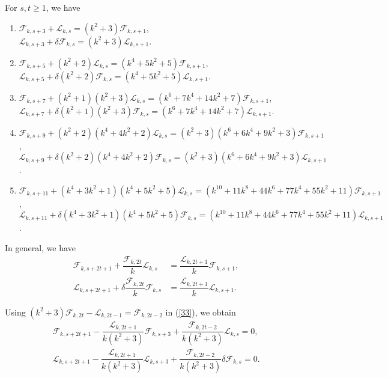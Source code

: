\begin{theorem}For $s, t\geq 1$, we have\label{3.16}
\begin{enumerate}
\item $\mathcal{F}_{k,s+3}+\mathcal{L}_{k,s}=(k^2+3)\mathcal{F}_{k,s+1}$,\\
$\mathcal{L}_{k,s+3}+\delta\mathcal{F}_{k,s}=(k^2+3)\mathcal{L}_{k,s+1}$.
\item $\mathcal{F}_{k,s+5}+(k^2+2)\mathcal{L}_{k,s}=(k^4+5k^2+5)\mathcal{F}_{k,s+1}$,\\
$\mathcal{L}_{k,s+5}+\delta(k^2+2)\mathcal{F}_{k,s}=(k^4+5k^2+5)\mathcal{L}_{k,s+1}$.
\item $\mathcal{F}_{k,s+7}+(k^2+1)(k^2+3)\mathcal{L}_{k,s}=(k^6+7k^4+14k^2+7)\mathcal{F}_{k,s+1}$,\\
$\mathcal{L}_{k,s+7}+\delta(k^2+1)(k^2+3)\mathcal{F}_{k,s}=(k^6+7k^4+14k^2+7)\mathcal{L}_{k,s+1}$.
\item $\mathcal{F}_{k,s+9}+(k^2+2)(k^4+4k^2+2)\mathcal{L}_{k,s}=(k^2+3)(k^6+6k^4+9k^2+3)\mathcal{F}_{k,s+1}$,\\
$\mathcal{L}_{k,s+9}+\delta(k^2+2)(k^4+4k^2+2)\mathcal{F}_{k,s}=(k^2+3)(k^6+6k^4+9k^2+3)\mathcal{L}_{k,s+1}$.
\item $\mathcal{F}_{k,s+11}+(k^4+3k^2+1)(k^4+5k^2+5)\mathcal{L}_{k,s}=(k^{10}+11k^8+44k^6+77k^4+55k^2+11)\mathcal{F}_{k,s+1}$,\\
$\mathcal{L}_{k,s+11}+\delta(k^4+3k^2+1)(k^4+5k^2+5)\mathcal{F}_{k,s}=(k^{10}+11k^8+44k^6+77k^4+55k^2+11)\mathcal{L}_{k,s+1}$.
\end{enumerate}
In general, we have
\begin{align}\label{33}
\mathcal{F}_{k,s+2t+1}+\dfrac{\mathcal{F}_{k,2t}}{k}\mathcal{L}_{k,s}&=\dfrac{\mathcal{L}_{k,2t+1}}{k}\mathcal{F}_{k,s+1},\\
\mathcal{L}_{k,s+2t+1}+\delta\dfrac{\mathcal{F}_{k,2t}}{k}\mathcal{F}_{k,s}&=\dfrac{\mathcal{L}_{k,2t+1}}{k}\mathcal{L}_{k,s+1}.
\end{align}
\end{theorem}
\begin{remark}
Using $(k^2+3)\mathcal{F}_{k,2t}-\mathcal{L}_{k,2t-1}=\mathcal{F}_{k,2t-2}$ in (\ref{33}), we obtain
\begin{align*}
\mathcal{F}_{k,s+2t+1}-\dfrac{\mathcal{L}_{k,2t+1}}{k(k^2+3)}\mathcal{F}_{k,s+3}+\dfrac{\mathcal{F}_{k,2t-2}}{k(k^2+3)}\mathcal{L}_{k,s}=0,\\
\mathcal{L}_{k,s+2t+1}-\dfrac{\mathcal{L}_{k,2t+1}}{k(k^2+3)}\mathcal{L}_{k,s+3}+\dfrac{\mathcal{F}_{k,2t-2}}{k(k^2+3)}\delta\mathcal{F}_{k,s}=0.
\end{align*}
\end{remark}
